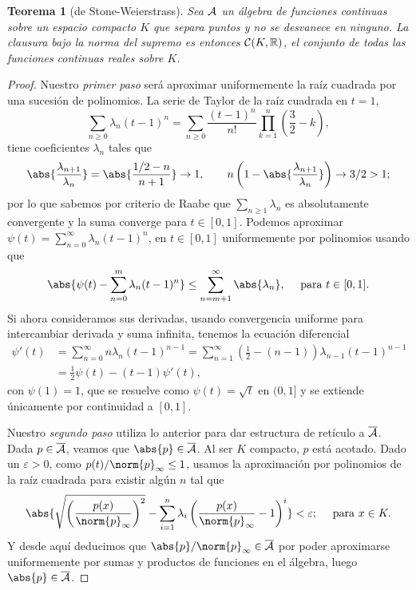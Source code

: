 \documentclass[11pt]{article}
\theoremstyle{plain}
\newtheorem{theorem}{Teorema}
\theoremstyle{definition}
\theoremstyle{remark}
\begin{document}
\begin{theorem}[de Stone-Weierstrass]\label{stone}
Sea ${\cal A}$ un álgebra de funciones continuas sobre un espacio
compacto $K$ que separa puntos y no se desvanece en ninguno.
La clausura bajo la norma del supremo es entonces ${\cal C}(K,\mathbb{R})$,
el conjunto de todas las funciones continuas reales sobre $K$.
\end{theorem}
\begin{proof}
  Nuestro \textit{primer paso} será aproximar uniformemente la raíz cuadrada
por una sucesión de polinomios. La serie de Taylor de la raíz
cuadrada en $t = 1$,
\[\sum_{n\geq 0} \lambda_n(t-1)^n =
\sum_{n\geq 0} \frac{(t - 1)^n}{n!} \prod_{k=1}^n \left( \frac{3}{2} - k \right),
\]
tiene coeficientes $\lambda_n$ tales que
\[
\abs{\frac{\lambda_{n+1}}{\lambda_n}} = 
\abs{\frac{1/2 - n}{n+1}} \to 1,
\qquad
n \left( 1 - \abs{\frac{\lambda_{n+1}}{\lambda_n}} \right) \to 3/2 > 1;
\]
por lo que sabemos por criterio de Raabe que $\sum_{n \geq 1} \lambda_n$ es absolutamente
convergente y la suma converge para $t \in [0,1]$. Podemos aproximar $\psi(t) = \sum_{n=0}^{\infty}\lambda_n(t-1)^n$,
en $t \in [0,1]$ uniformemente por polinomios usando que
\[
\abs{\psi(t) - \sum_{n=0}^{m} \lambda_n(t-1)^n} \leq
\sum_{n=m+1}^{\infty} \abs{\lambda_n},
\quad\mbox{ para } t \in [0,1].
\]
Si ahora consideramos sus derivadas, usando convergencia uniforme para
intercambiar derivada y suma infinita, tenemos la ecuación diferencial
\[\begin{aligned}
\psi'(t) &=
\sum_{n=0}^\infty n\lambda_n(t-1)^{n-1} =
\sum_{n=1}^\infty \left(\frac{1}{2} - (n-1)\right)\lambda_{n-1}(t-1)^{n-1} \\&=
\frac{1}{2}\psi(t) - (t-1)\psi'(t),
\end{aligned}\]
con $\psi(1) = 1$, que se resuelve como $\psi(t) = \sqrt{t}$ en $(0,1]$ y
se extiende únicamente por continuidad a $[0,1]$.

Nuestro \textit{segundo paso} utiliza lo anterior para dar estructura de
retículo a $\overline{{\cal A}}$.
Dada $p \in \overline{{\cal A}}$, veamos que $\abs{p} \in {\overline{\cal A}}$. Al ser $K$ compacto, $p$ está acotado.
Dado un $\varepsilon > 0$, como $p(t)/\norm{p}_{\infty} \leq 1$, usamos la aproximación por polinomios
de la raíz cuadrada para existir algún $n$ tal que
\[
\abs{\sqrt{\left(\frac{p(x)}{\norm{p}_{\infty}}\right)^2} -
\sum_{i=1}^n \lambda_i \left(\frac{p(x)}{\norm{p}_{\infty}}-1\right)^i} < \varepsilon;
\quad
\mbox{ para } x \in K.
\]
Y desde aquí deducimos que $\abs{p}/\norm{p}_{\infty} \in \overline{{\cal A}}$ por
poder aproximarse uniformemente por sumas y productos de funciones en el álgebra,
luego $\abs{p} \in \overline{\cal A}$.


\end{proof}
\end{document}
